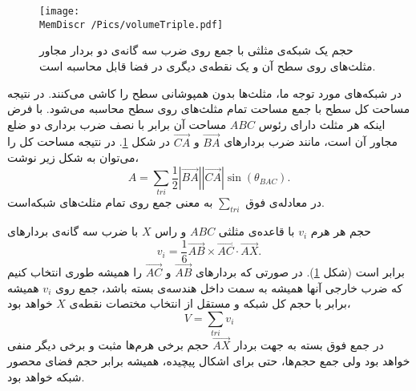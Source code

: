 \begin{figure}[h]
\begin{center}
\texttt{[image: \\MemDiscr /Pics/volumeTriple.pdf]}
\caption{
حجم یک شبکه‌ی مثلثی با جمع روی ضرب سه گانه‌ی دو بردار مجاور مثلث‌های روی سطح آن و یک نقطه‌ی دیگری در فضا قابل محاسبه است.
}
\label{fig:volumeTriple}
\end{center}
\end{figure}


در شبکه‌های مورد توجه ما، مثلث‌ها بدون همپوشانی سطح را کاشی می‌کنند. در نتیجه مساحت کل سطح با جمع مساحت تمام مثلث‌های روی سطح محاسبه می‌شود. با فرض اینکه هر مثلث دارای رئوس
$ABC$
مساحت آن برابر با نصف ضرب برداری دو ضلع مجاور آن است، مانند ضرب بردارهای 
$\overrightarrow{BA}$
و
$\overrightarrow{CA}$
در شکل 
\ref{fig:volumeTriple}.
 در نتیجه مساحت کل را می‌توان به شکل زیر نوشت،
\begin{equation}
A =\sum_{tri}\frac{1}{2}|\overrightarrow{BA}||\overrightarrow{CA}|\sin(\theta_{BAC}).
\label{eq:areaSum}
\end{equation}
در معادله‌ی فوق
$\sum_{tri}$
به معنی جمع روی تمام مثلث‌های شبکه‌است. 

حجم هر هرم
$v_i$
با قاعده‌ی مثلثی
$ABC$
و راس
$X$
 با ضرب سه گانه‌ی بردارهای
\begin{equation}
v_i=\frac{1}{6}\overrightarrow{AB}\times\overrightarrow{AC}\cdot\overrightarrow{AX}.
\label{eq:tripleProduct}
\end{equation}
برابر است (شکل 
\ref{fig:volumeTriple}).
 در صورتی که بردارهای
$\overrightarrow {AB}$
و
$\overrightarrow {AC}$
را همیشه‌ طوری انتخاب کنیم که ضرب خارجی‌ آنها همیشه به سمت داخل هندسه‌ی بسته باشد، جمع روی 
$v_i$
همیشه برابر با حجم کل شبکه‌ و مستقل از انتخاب مختصات نقطه‌ی 
$X$
 خواهد بود،
 \begin{equation}
V= \sum_{tri} v_i
\label{eq:volumeSum}
\end{equation}
در جمع فوق بسته به جهت بردار
$\overrightarrow {AX}$
حجم برخی هرم‌ها مثبت و برخی دیگر منفی خواهد بود ولی جمع حجم‌ها، حتی برای اشکال پیچیده، همیشه برابر حجم فضای محصور شبکه خواهد بود.


